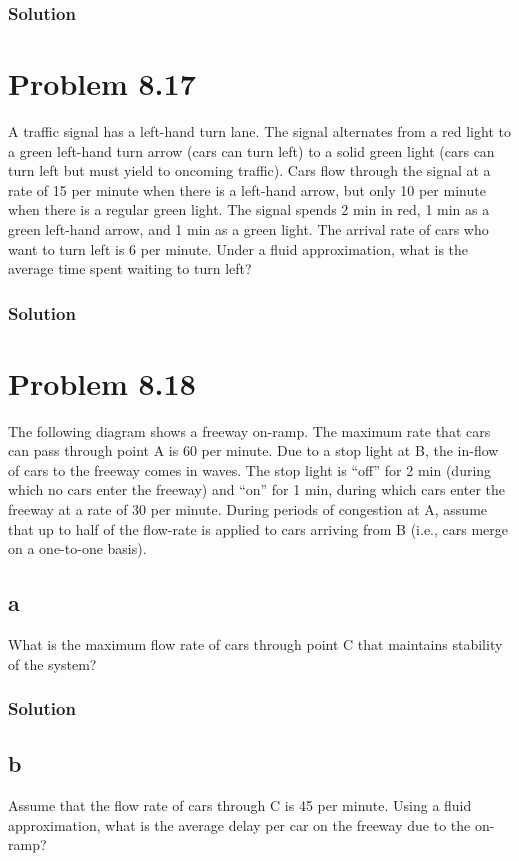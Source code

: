 \documentclass{amsart}
\begin{document}
\subsubsection*{Solution}

\section{Problem 8.17} %
A traffic signal has a left-hand turn lane. The signal alternates from a red
light to a green left-hand turn arrow (cars can turn left) to a solid green light
(cars can turn left but must yield to oncoming traffic). Cars flow through
the signal at a rate of 15 per minute when there is a left-hand arrow, but
only 10 per minute when there is a regular green light. The signal spends
2 min in red, 1 min as a green left-hand arrow, and 1 min as a green light.
The arrival rate of cars who want to turn left is 6 per minute. Under a fluid
approximation, what is the average time spent waiting to turn left?
\subsubsection*{Solution}

\section{Problem 8.18} %
The following diagram shows a freeway on-ramp. The maximum rate that
cars can pass through point A is 60 per minute. Due to a stop light at B, the
in-flow of cars to the freeway comes in waves. The stop light is “off” for
2 min (during which no cars enter the freeway) and “on” for 1 min, during
which cars enter the freeway at a rate of 30 per minute. During periods of
congestion at A, assume that up to half of the flow-rate is applied to cars
arriving from B (i.e., cars merge on a one-to-one basis).
\subsection*{a}
What is the maximum flow rate of cars through point C that maintains
stability of the system?
\subsubsection*{Solution}
\subsection*{b}
Assume that the flow rate of cars through C is 45 per minute. Using a
fluid approximation, what is the average delay per car on the freeway
due to the on-ramp?
\end{document}
